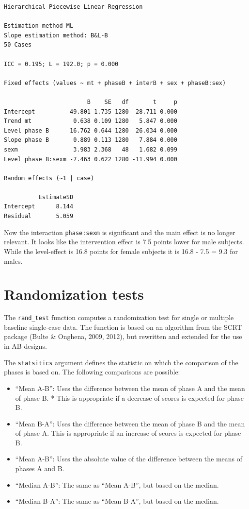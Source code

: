 \documentclass[
]{book}
\providecommand{\tightlist}{%
  \setlength{\itemsep}{0pt}\setlength{\parskip}{0pt}}
\begin{document}
\begin{verbatim}
Hierarchical Piecewise Linear Regression

Estimation method ML 
Slope estimation method: B&L-B 
50 Cases

ICC = 0.195; L = 192.0; p = 0.000

Fixed effects (values ~ mt + phaseB + interB + sex + phaseB:sex)

                        B    SE   df       t     p
Intercept          49.801 1.735 1280  28.711 0.000
Trend mt            0.638 0.109 1280   5.847 0.000
Level phase B      16.762 0.644 1280  26.034 0.000
Slope phase B       0.889 0.113 1280   7.884 0.000
sexm                3.983 2.368   48   1.682 0.099
Level phase B:sexm -7.463 0.622 1280 -11.994 0.000

Random effects (~1 | case)

          EstimateSD
Intercept      8.144
Residual       5.059
\end{verbatim}

Now the interaction \texttt{phase:sexm} is significant and the main effect is no longer relevant. It looks like the intervention effect is 7.5 points lower for male subjects. While the level-effect is 16.8 points for female subjects it is 16.8 - 7.5 = 9.3 for males.

\hypertarget{randomization-tests}{%
\chapter{Randomization tests}\label{randomization-tests}}

The \texttt{rand\_test} function computes a randomization test for single or multiple baseline single-case data. The function is based on an algorithm from the SCRT package (Bulte \& Onghena, 2009, 2012), but rewritten and extended for the use in AB designs.

The \texttt{statsitics} argument defines the statistic on which the comparison of the phases is based on. The following comparisons are possible:

\begin{itemize}
\tightlist
\item
  ``Mean A-B'': Uses the difference between the mean of phase A and the mean of phase B. * This is appropriate if a decrease of scores is expected for phase B.
\item
  ``Mean B-A'': Uses the difference between the mean of phase B and the mean of phase A. This is appropriate if an increase of scores is expected for phase B.
\item
  ``Mean \textbar A-B\textbar{}'': Uses the absolute value of the difference between the means of phases A and B.
\item
  ``Median A-B'': The same as ``Mean A-B'', but based on the median.
\item
  ``Median B-A'': The same as ``Mean B-A'', but based on the median.
\end{itemize}
\end{document}
